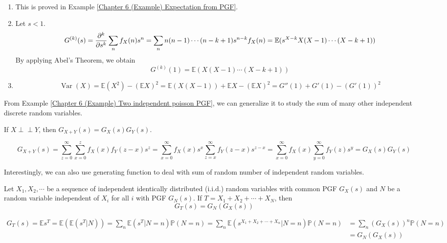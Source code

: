 \documentclass{huhtakm-template-book}
\newcommand{\independent}{\perp\!\!\!\perp}
\newcommand{\prob}{\mathbb{P}}
\newcommand{\expect}{\mathbb{E}}
\DeclareMathOperator{\Var}{Var}
\begin{document}
\begin{proofing}
	\begin{enumerate}
		\item This is proved in Example \ref{Chapter 6 (Example) Expectation from PGF}.
		\item Let $s<1$.
		\begin{equation*}
			G^{(k)}(s)=\pdv*[order={k}]{\sum_{n}f_{X}(n)s^{n}}{s}=\sum_{n}n(n-1)\cdots(n-k+1)s^{n-k}f_{X}(n)=\expect(s^{X-k}X(X-1)\cdots(X-k+1))
		\end{equation*}
		By applying Abel's Theorem, we obtain
		\begin{equation*}
			G^{(k)}(1)=\expect(X(X-1)\cdots(X-k+1))
		\end{equation*}
		\item 
		\begin{equation*}
			\Var(X)=\expect(X^{2})-(\expect X)^{2}=\expect(X(X-1))+\expect X-(\expect X)^{2}=G''(1)+G'(1)-(G'(1))^{2}
		\end{equation*}
	\end{enumerate}
\end{proofing}
From Example \ref{Chapter 6 (Example) Two independent poisson PGF}, we can generalize it to study the sum of many other independent discrete random variables.
\begin{thm}
	\label{Chapter 6 (Theorem) PGF for sum of random independent variables}
	If $X\independent Y$, then $G_{X+Y}(s)=G_{X}(s)G_{Y}(s)$.
\end{thm}
\begin{proofing}
	\begin{equation*}
		G_{X+Y}(s)=\sum_{z=0}^{\infty}\sum_{x=0}^{z}f_{X}(x)f_{Y}(z-x)s^{z}=\sum_{x=0}^{\infty}f_{X}(x)s^{x}\sum_{z=x}^{\infty}f_{Y}(z-x)s^{z-x}=\sum_{x=0}^{\infty}f_{X}(x)\sum_{y=0}^{\infty}f_{Y}(z)s^{y}=G_{X}(s)G_{Y}(s)
	\end{equation*}
\end{proofing}
Interestingly, we can also use generating function to deal with sum of random number of independent random variables.
\begin{thm}
	Let $X_{1},X_{2},\cdots$ be a sequence of independent identically distributed (i.i.d.) random variables with common PGF $G_{X}(s)$ and $N$ be a random variable independent of $X_{i}$ for all $i$ with PGF $G_{N}(s)$. If $T=X_{1}+X_{2}+\cdots+X_{N}$, then
	\begin{equation*}
		G_{T}(s)=G_{N}(G_{X}(s))
	\end{equation*}
\end{thm}
\begin{proofing}
	\begin{align*}
		G_{T}(s)=\expect s^{T}=\expect(\expect(s^{T}|N))=\sum_{n}\expect(s^{T}|N=n)\prob(N=n)
		=\sum_{n}\expect(s^{X_{1}+X_{2}+\cdots+X_{n}}|N=n)\prob(N=n)
		&=\sum_{n}(G_{X}(s))^{n}\prob(N=n)\\
		&=G_{N}(G_{X}(s))
	\end{align*}
\end{proofing}
\end{document}
